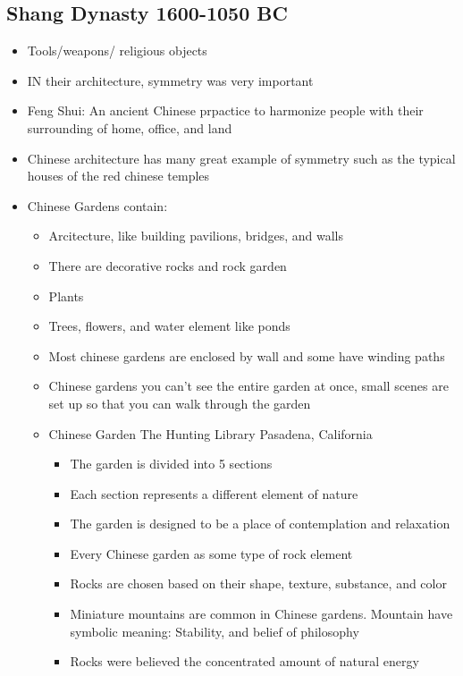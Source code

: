 \documentclass{article}
\begin{document}
\subsection{Shang Dynasty 1600-1050 BC}
\begin{itemize}
  \item Tools/weapons/ religious objects
  \item IN their architecture, symmetry was very important
  \item Feng Shui: An ancient Chinese prpactice to harmonize people
    with their surrounding of home, office, and land
  \item Chinese architecture has many great example of symmetry such as the typical
    houses of the red chinese temples
  \item Chinese Gardens contain:
    \begin{itemize}
      \item Arcitecture, like building pavilions, bridges, and walls
      \item There are decorative rocks and rock garden
      \item Plants
      \item Trees, flowers, and water element like ponds
      \item Most chinese gardens are enclosed by wall and some have
        winding paths
      \item Chinese gardens you can't see the entire garden at once,
        small scenes are set up so that you can walk through the garden
      \item Chinese Garden The Hunting Library Pasadena, California
        \begin{itemize}
          \item The garden is divided into 5 sections
          \item Each section represents a different element of nature
          \item The garden is designed to be a place of contemplation and relaxation
          \item Every Chinese garden as some type of rock element
          \item Rocks are chosen based on their shape, texture, substance, and color
          \item Miniature mountains are common in Chinese gardens.
            Mountain have symbolic meaning: Stability, and belief of philosophy
          \item Rocks were believed the concentrated amount of natural energy
        \end{itemize}
    \end{itemize}
\end{itemize}
\end{document}
